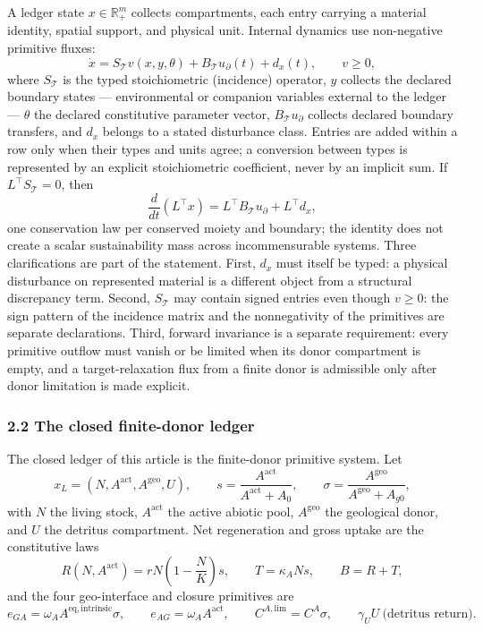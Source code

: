 \documentclass[11pt]{article}
\begin{document}
A ledger state \(x \in \mathbb{R}^m_+\) collects compartments, each
entry carrying a material identity, spatial support, and physical unit.
Internal dynamics use non-negative primitive fluxes:
\[\dot x = S_{\mathcal{T}} v(x, y, \theta) + B_{\mathcal{T}} u_{\partial}(t) + d_x(t), \qquad v \ge 0, \tag{1}\]
where \(S_{\mathcal{T}}\) is the typed stoichiometric (incidence)
operator, \(y\) collects the declared boundary states --- environmental
or companion variables external to the ledger --- \(\theta\) the
declared constitutive parameter vector, \(B_{\mathcal{T}} u_{\partial}\)
collects declared boundary transfers, and \(d_x\) belongs to a stated
disturbance class. Entries are added within a row only when their types
and units agree; a conversion between types is represented by an
explicit stoichiometric coefficient, never by an implicit sum. If
\(L^\top S_{\mathcal{T}} = 0\), then
\[\frac{d}{dt}(L^\top x) = L^\top B_{\mathcal{T}} u_{\partial} + L^\top d_x,\]
one conservation law per conserved moiety and boundary; the identity
does not create a scalar sustainability mass across incommensurable
systems. Three clarifications are part of the statement. First, \(d_x\)
must itself be typed: a physical disturbance on represented material is
a different object from a structural discrepancy term. Second,
\(S_{\mathcal{T}}\) may contain signed entries even though \(v \ge 0\):
the sign pattern of the incidence matrix and the nonnegativity of the
primitives are separate declarations. Third, forward invariance is a
separate requirement: every primitive outflow must vanish or be limited
when its donor compartment is empty, and a target-relaxation flux from a
finite donor is admissible only after donor limitation is made explicit.

\subsubsection{2.2 The closed finite-donor
ledger}\label{the-closed-finite-donor-ledger}

The closed ledger of this article is the finite-donor primitive system.
Let
\[x_L = (N, A^{\mathrm{act}}, A^{\mathrm{geo}}, U), \qquad s = \frac{A^{\mathrm{act}}}{A^{\mathrm{act}} + A_0}, \qquad \sigma = \frac{A^{\mathrm{geo}}}{A^{\mathrm{geo}} + A_{g0}},\]
with \(N\) the living stock, \(A^{\mathrm{act}}\) the active abiotic
pool, \(A^{\mathrm{geo}}\) the geological donor, and \(U\) the detritus
compartment. Net regeneration and gross uptake are the constitutive laws
\[R(N, A^{\mathrm{act}}) = rN\left(1 - \frac{N}{K}\right)s, \qquad T = \kappa_A N s, \qquad B = R + T,\]
and the four geo-interface and closure primitives are
\[e_{GA} = \omega_A A^{\mathrm{eq,intrinsic}} \sigma, \qquad e_{AG} = \omega_A A^{\mathrm{act}}, \qquad C^{A,\mathrm{lim}} = C^A \sigma, \qquad \gamma_U U \ \text{(detritus return)}.\]
\end{document}
